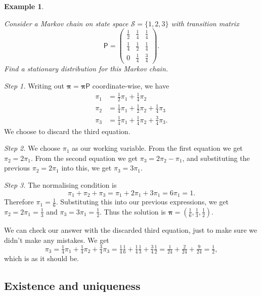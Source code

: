 \documentclass[
  a4paper,
]{article}
\theoremstyle{definition}
\theoremstyle{definition}
\newtheorem{example}{Example}[section]
\theoremstyle{definition}
\theoremstyle{remark}
\begin{document}
\begin{example}
\protect\hypertarget{exm:stationary-1}{}\label{exm:stationary-1}

\emph{Consider a Markov chain on state space \(\mathcal S = \{1,2,3\}\) with transition matrix}
\[ \mathsf P = \begin{pmatrix} \tfrac12 & \tfrac14& \frac14 \\
                   \tfrac14& \frac12& \frac14 \\
                   0       & \frac14 & \frac34 \end{pmatrix} . \]
\emph{Find a stationary distribution for this Markov chain.}

\emph{Step 1.} Writing out \(\boldsymbol \pi = \boldsymbol \pi\mathsf P\) coordinate-wise, we have
\begin{align*}
\pi_1 &= \tfrac12 \pi_1 + \tfrac14\pi_2 \\
\pi_2 &= \tfrac14\pi_1 + \tfrac12\pi_2 + \tfrac14\pi_3 \\
\pi_3 &= \tfrac14\pi_1 + \tfrac14\pi_2 + \tfrac34\pi_3 .
\end{align*}
We choose to discard the third equation.

\emph{Step 2.} We choose \(\pi_1\) as our working variable. From the first equation we get \(\pi_2 = 2\pi_1\). From the second equation we get \(\pi_3 = 2\pi_2 - \pi_1\), and substituting the previous \(\pi_2 = 2\pi_1\) into this, we get \(\pi_3 = 3\pi_1\).

\emph{Step 3.} The normalising condition is
\[ \pi_1 + \pi_2 + \pi_3 = \pi_1 + 2\pi_1 + 3\pi_1 = 6\pi_1 = 1 . \]
Therefore \(\pi_1 = \frac16\). Substituting this into our previous expressions, we get \(\pi_2 = 2\pi_1 = \frac13\) and \(\pi_3 = 3\pi_1 = \frac12\).
Thus the solution is
\(\boldsymbol\pi = ( \tfrac16, \tfrac13, \tfrac12 )\).

We can check our answer with the discarded third equation, just to make sure we didn't make any mistakes. We get
\[ \pi_3 = \tfrac14\pi_1 + \tfrac14\pi_2 + \tfrac34\pi_3 = \tfrac14\tfrac16 + \tfrac14\tfrac13+\tfrac34\tfrac12 = \tfrac1{24} + \tfrac2{24} + \tfrac{9}{24} = \tfrac{1}{2} , \]
which is as it should be.

\end{example}

\hypertarget{exist-unique}{%
\subsection{Existence and uniqueness}\label{exist-unique}}
\end{document}
